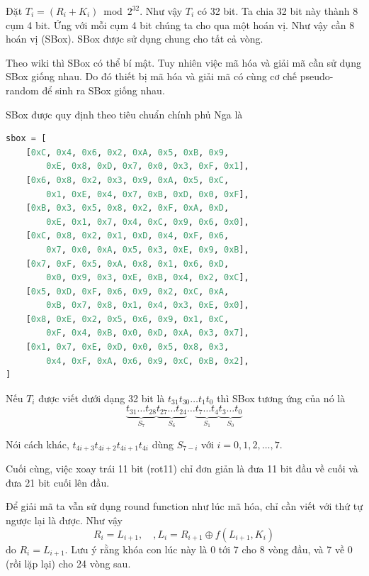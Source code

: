 Đặt $T_i = (R_i + K_i) \bmod 2^{32}$. Như vậy $T_i$ có 32 bit. Ta 
chia 32 bit này thành 8 cụm 4 bit. Ứng với mỗi cụm 4 bit chúng ta 
cho qua một hoán vị. Như vậy cần 8 hoán vị (SBox). SBox được sử dụng
chung cho tất cả vòng.

Theo wiki thì SBox có thể bí mật. Tuy nhiên việc mã hóa và giải
mã cần sử dụng SBox giống nhau. Do đó thiết bị mã hóa và giải mã
có cùng cơ chế pseudo-random để sinh ra SBox giống nhau.

SBox được quy định theo tiêu chuẩn chính phủ Nga là

\begin{lstlisting}[language=Python]
sbox = [
    [0xC, 0x4, 0x6, 0x2, 0xA, 0x5, 0xB, 0x9, 
        0xE, 0x8, 0xD, 0x7, 0x0, 0x3, 0xF, 0x1],
    [0x6, 0x8, 0x2, 0x3, 0x9, 0xA, 0x5, 0xC, 
        0x1, 0xE, 0x4, 0x7, 0xB, 0xD, 0x0, 0xF],
    [0xB, 0x3, 0x5, 0x8, 0x2, 0xF, 0xA, 0xD, 
        0xE, 0x1, 0x7, 0x4, 0xC, 0x9, 0x6, 0x0],
    [0xC, 0x8, 0x2, 0x1, 0xD, 0x4, 0xF, 0x6, 
        0x7, 0x0, 0xA, 0x5, 0x3, 0xE, 0x9, 0xB],
    [0x7, 0xF, 0x5, 0xA, 0x8, 0x1, 0x6, 0xD, 
        0x0, 0x9, 0x3, 0xE, 0xB, 0x4, 0x2, 0xC],
    [0x5, 0xD, 0xF, 0x6, 0x9, 0x2, 0xC, 0xA, 
        0xB, 0x7, 0x8, 0x1, 0x4, 0x3, 0xE, 0x0],
    [0x8, 0xE, 0x2, 0x5, 0x6, 0x9, 0x1, 0xC, 
        0xF, 0x4, 0xB, 0x0, 0xD, 0xA, 0x3, 0x7],
    [0x1, 0x7, 0xE, 0xD, 0x0, 0x5, 0x8, 0x3, 
        0x4, 0xF, 0xA, 0x6, 0x9, 0xC, 0xB, 0x2],
]
\end{lstlisting}

Nếu $T_i$ được viết dưới dạng 32 bit là $t_{31} t_{30} \ldots t_1 t_0$
thì SBox tương ứng của nó là
\[
    \underbrace{t_{31} \ldots t_{28}}_{S_7}
    \underbrace{t_{27} \ldots t_{24}}_{S_6}
    \ldots
    \underbrace{t_{7} \ldots t_{4}}_{S_1}
    \underbrace{t_3 \ldots t_0}_{S_0}
\]

Nói cách khác, $t_{4i+3} t_{4i+2} t_{4i+1} t_{4i}$ dùng $S_{7-i}$ với
$i = 0, 1, 2, \ldots, 7$.

Cuối cùng, việc xoay trái 11 bit (rot11) chỉ đơn giản là đưa 11 bit đầu
về cuối và đưa 21 bit cuối lên đầu.

Để giải mã ta vẫn sử dụng round function như lúc mã hóa, 
chỉ cần viết với thứ tự ngược lại là được. Như vậy
\[R_i = L_{i+1}, \quad, L_i = R_{i+1} \oplus f(L_{i+1}, K_i)\]
do $R_i = L_{i+1}$. Lưu ý rằng khóa con lúc này là 0 tới 7 cho 
8 vòng đầu, và 7 về 0 (rồi lặp lại) cho 24 vòng sau.